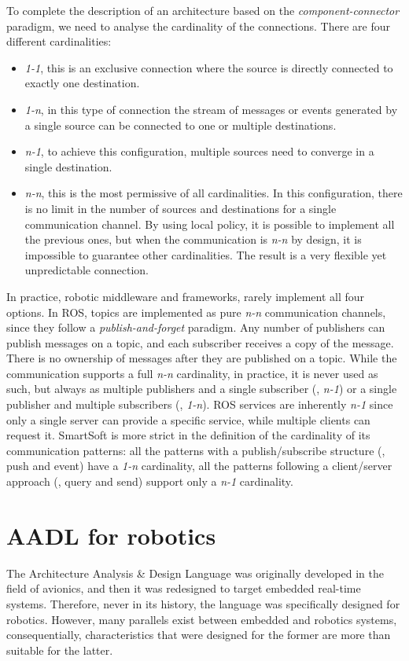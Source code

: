 To complete the description of an architecture based on the \textit{component-connector} paradigm, we need to analyse the cardinality of the connections. There are four different cardinalities:
\begin{itemize}
\item \textit{1-1}, this is an exclusive connection where the source is directly connected to exactly one destination.
\item \textit{1-n}, in this type of connection the stream of messages or events generated by a single source can be connected to one or multiple destinations.
\item \textit{n-1}, to achieve this configuration, multiple sources need to converge in a single destination.
\item \textit{n-n}, this is the most permissive of all cardinalities. In this configuration, there is no limit in the number of sources and destinations for a single communication channel. By using local policy, it is possible to implement all the previous ones, but when the communication is \textit{n-n} by design, it is impossible to guarantee other cardinalities. The result is a very flexible yet unpredictable connection.
\end{itemize}
In practice, robotic middleware and frameworks, rarely implement all four options. In ROS, topics are implemented as pure \textit{n-n} communication channels, since they follow a \textit{publish-and-forget} paradigm. Any number of publishers can publish messages on a topic, and each subscriber receives a copy of the message. There is no ownership of messages after they are published on a topic. While the communication supports a full \textit{n-n} cardinality, in practice, it is never used as such, but always as multiple publishers and a single subscriber (\ie, \textit{n-1}) or a single publisher and multiple subscribers (\ie, \textit{1-n}). ROS services are inherently \textit{n-1} since only a single server can provide a specific service, while multiple clients can request it. SmartSoft is more strict in the definition of the cardinality of its communication patterns: all the patterns with a publish/subscribe structure (\ie, push and event) have a \textit{1-n} cardinality, all the patterns following a client/server approach (\ie, query and send) support only a \textit{n-1} cardinality.

\section{AADL for robotics}
\label{sec:aadl-robot}
The Architecture Analysis \& Design Language was originally developed in the field of avionics, and then it was redesigned to target embedded real-time systems. Therefore, never in its history, the language was specifically designed for robotics. However, many parallels exist between embedded and robotics systems, consequentially, characteristics that were designed for the former are more than suitable for the latter.

